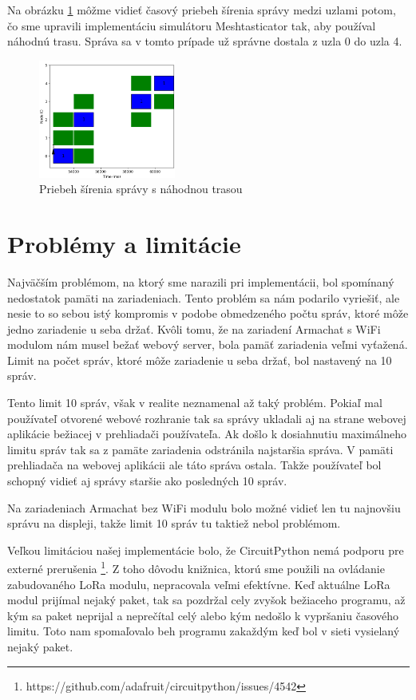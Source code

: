 \documentclass[slovak,master]{diploma}
\begin{document}
Na obrázku \ref{fig:randomizePath} môžme vidieť časový priebeh šírenia správy medzi uzlami potom, čo sme upravili implementáciu simulátoru Meshtasticator tak, 
aby používal náhodnú trasu. Správa sa v tomto prípade už správne dostala z uzla 0 do uzla 4.

\begin{figure}[h!]
  \centering
  \includegraphics[width=0.4\textwidth]{Figures/randomizePath.png}
  \caption{Priebeh šírenia správy s náhodnou trasou}
  \label{fig:randomizePath}
\end{figure}

\section{Problémy a limitácie}
Najväčším problémom, na ktorý sme narazili pri implementácii, bol spomínaný nedostatok pamäti na zariadeniach. Tento problém sa nám podarilo 
vyriešiť, ale nesie to so sebou istý kompromis v podobe obmedzeného počtu správ, ktoré môže jedno zariadenie u seba držať. Kvôli tomu, že na 
zariadení Armachat s WiFi modulom nám musel bežať webový server, bola pamäť zariadenia veľmi vyťažená. Limit na počet správ, ktoré môže zariadenie u seba držať, bol nastavený 
na 10 správ. 

Tento limit 10 správ, však v realite neznamenal až taký problém. Pokiaľ mal používateľ otvorené webové rozhranie tak sa správy ukladali aj na strane webovej aplikácie 
bežiacej v prehliadači používateľa. Ak došlo k dosiahnutiu maximálneho limitu správ tak sa z pamäte zariadenia odstránila najstaršia správa. V pamäti prehliadača na webovej aplikácii 
ale táto správa ostala. Takže používateľ bol schopný vidieť aj správy staršie ako posledných 10 správ.

Na zariadeniach Armachat bez WiFi modulu bolo možné vidieť len tu najnovšiu správu na displeji, takže limit 10 správ tu taktiež nebol problémom.

Veľkou limitáciou našej implementácie bolo, že CircuitPython nemá podporu pre externé prerušenia \footnote[1]{https://github.com/adafruit/circuitpython/issues/4542}. Z toho dôvodu knižnica, ktorú sme použili na ovládanie zabudovaného LoRa modulu, 
nepracovala veľmi efektívne. Keď aktuálne LoRa modul prijímal nejaký paket, tak sa pozdržal cely zvyšok bežiaceho programu, až kým sa paket neprijal a neprečítal celý alebo kým nedošlo k vypršaniu 
časového limitu. Toto nam spomaľovalo beh programu zakaždým keď bol v sieti vysielaný nejaký paket.
\end{document}

